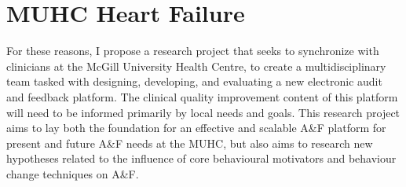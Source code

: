 \section{MUHC Heart Failure}
For these reasons, I propose a research project that seeks to synchronize with clinicians at the McGill University Health Centre, to create a multidisciplinary team tasked with designing, developing, and evaluating a new electronic audit and feedback platform. The clinical quality improvement content of this platform will need to be informed primarily by local needs and goals. This research project aims to lay both \cite{ivers2012audit} the foundation for an effective and scalable A\&F platform for present and future A\&F needs at the \gls{MUHC}, but also \cite{foy2005we} aims to research new hypotheses related to the influence of core behavioural motivators and behaviour change techniques on A\&F.